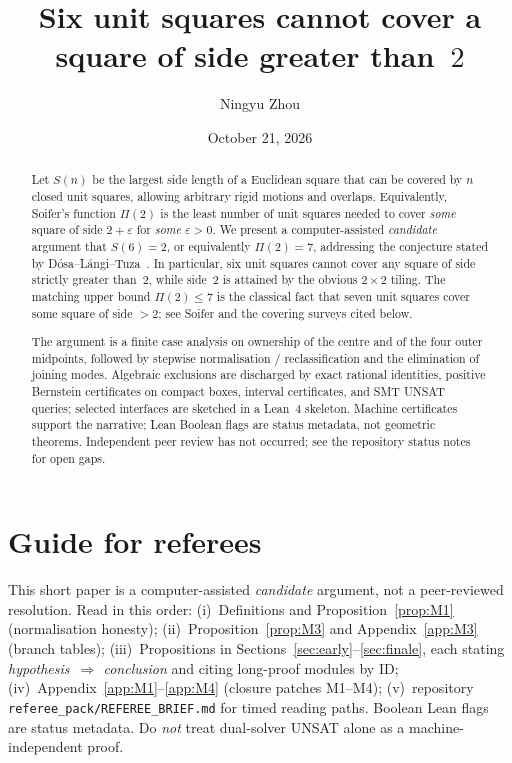 \documentclass[11pt,reqno]{amsart}
\title[Six unit squares cannot cover a larger square]
{Six unit squares cannot cover a square of side greater than~$2$}
\author{Ningyu Zhou}
\date{October 21, 2026}
\theoremstyle{definition}
\begin{document}
\begin{abstract}
Let $S(n)$ be the largest side length of a Euclidean square that can be covered
by $n$ closed unit squares, allowing arbitrary rigid motions and overlaps.
Equivalently, Soifer's function $\Pi(2)$ is the least number of unit squares
needed to cover \emph{some} square of side $2+\varepsilon$ for \emph{some}
$\varepsilon>0$.
We present a computer-assisted \emph{candidate} argument that $S(6)=2$, or
equivalently $\Pi(2)=7$, addressing the conjecture stated by
D\'osa--L\'angi--Tuza~\cite{DLT2026}.
In particular, six unit squares cannot cover any square of side strictly
greater than~$2$, while side~$2$ is attained by the obvious $2\times 2$ tiling.
The matching upper bound $\Pi(2)\le 7$ is the classical fact that seven unit
squares cover some square of side $>2$; see Soifer and the covering surveys
cited below.

The argument is a finite case analysis on ownership of the centre and of the
four outer midpoints, followed by stepwise normalisation / reclassification
and the elimination of joining modes.  Algebraic exclusions are discharged by
exact rational identities, positive Bernstein certificates on compact boxes,
interval certificates, and SMT UNSAT queries; selected interfaces are sketched
in a Lean~4 skeleton.  Machine certificates support the narrative; Lean Boolean
flags are status metadata, not geometric theorems.  Independent peer review has
not occurred; see the repository status notes for open gaps.
\end{abstract}


\maketitle

\tableofcontents

\section*{Guide for referees}
This short paper is a computer-assisted \emph{candidate} argument, not a
peer-reviewed resolution.  Read in this order: (i)~Definitions and
Proposition~\ref{prop:M1} (normalisation honesty); (ii)~Proposition~\ref{prop:M3}
and Appendix~\ref{app:M3} (branch tables); (iii)~Propositions in
Sections~\ref{sec:early}--\ref{sec:finale}, each stating
\emph{hypothesis~$\Rightarrow$ conclusion} and citing long-proof modules by
ID; (iv)~Appendix~\ref{app:M1}--\ref{app:M4} (closure patches M1--M4);
(v)~repository \texttt{referee\_pack/REFEREE\_BRIEF.md} for timed reading
paths.  Boolean Lean flags are status metadata.  Do \emph{not} treat
dual-solver UNSAT alone as a machine-independent proof.
\end{document}
